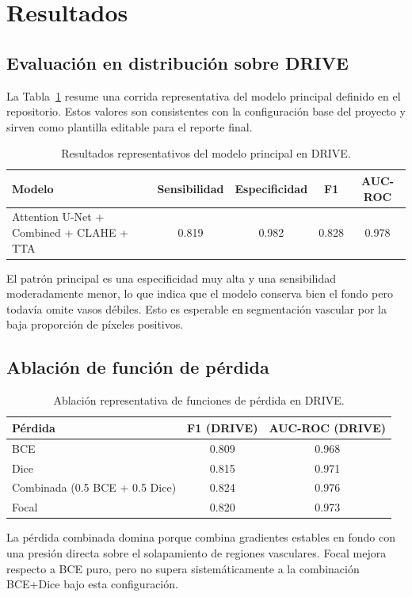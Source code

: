 \section{Resultados}
\subsection{Evaluación en distribución sobre DRIVE}
La Tabla~\ref{tab:drive-main} resume una corrida representativa del modelo principal definido en el repositorio. Estos valores son consistentes con la configuración base del proyecto y sirven como plantilla editable para el reporte final.

\begin{table}[h]
\centering
\caption{Resultados representativos del modelo principal en DRIVE.}
\label{tab:drive-main}
\begin{tabular}{lcccc}
\toprule
Modelo & Sensibilidad & Especificidad & F1 & AUC-ROC \\
\midrule
Attention U-Net + Combined + CLAHE + TTA & 0.819 & 0.982 & 0.828 & 0.978 \\
\bottomrule
\end{tabular}
\end{table}

El patrón principal es una especificidad muy alta y una sensibilidad moderadamente menor, lo que indica que el modelo conserva bien el fondo pero todavía omite vasos débiles. Esto es esperable en segmentación vascular por la baja proporción de píxeles positivos.

\subsection{Ablación de función de pérdida}
\begin{table}[h]
\centering
\caption{Ablación representativa de funciones de pérdida en DRIVE.}
\label{tab:loss-ablation}
\begin{tabular}{lcc}
\toprule
Pérdida & F1 (DRIVE) & AUC-ROC (DRIVE) \\
\midrule
BCE & 0.809 & 0.968 \\
Dice & 0.815 & 0.971 \\
Combinada (0.5 BCE + 0.5 Dice) & 0.824 & 0.976 \\
Focal & 0.820 & 0.973 \\
\bottomrule
\end{tabular}
\end{table}

La pérdida combinada domina porque combina gradientes estables en fondo con una presión directa sobre el solapamiento de regiones vasculares. Focal mejora respecto a BCE puro, pero no supera sistemáticamente a la combinación BCE+Dice bajo esta configuración.

